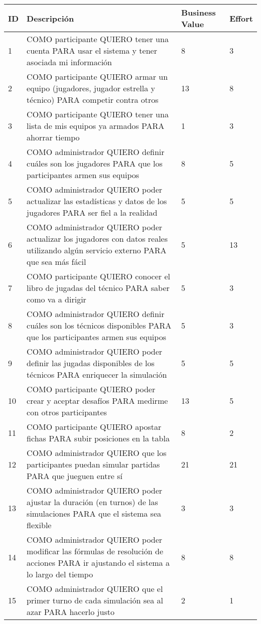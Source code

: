 \begin{center}
  \begin{tabular}{| l | p{10cm} | l | l | }
    \hline
ID & Descripción & Business Value & Effort\\  \hline
1 & COMO participante QUIERO tener una cuenta PARA usar el sistema y tener asociada mi información & 8 & 3\\  \hline
2 & COMO participante QUIERO armar un equipo (jugadores, jugador estrella y técnico) PARA competir contra otros & 13 & 8\\  \hline
3 & COMO participante QUIERO tener una lista de mis equipos ya armados PARA ahorrar tiempo & 1 & 3\\  \hline
4 & COMO administrador QUIERO definir cuáles son los jugadores PARA que los participantes armen sus equipos & 8 & 5\\  \hline
5 & COMO administrador QUIERO poder actualizar las estadísticas y datos de los jugadores PARA ser fiel a la realidad & 5 & 5\\  \hline
6 & COMO administrador QUIERO poder actualizar los jugadores con datos reales utilizando algún servicio externo PARA que sea más fácil & 5 & 13\\  \hline
7 & COMO participante QUIERO conocer el libro de jugadas del técnico PARA saber como va a dirigir & 5 & 3\\  \hline
8 & COMO administrador QUIERO definir cuáles son los técnicos disponibles PARA que los participantes armen sus equipos & 5 & 3\\  \hline
9 & COMO administrador QUIERO poder definir las jugadas disponibles de los técnicos PARA enriquecer la simulación & 5 & 5\\  \hline
10 & COMO participante QUIERO poder crear y aceptar desafíos PARA medirme con otros participantes & 13 & 5\\  \hline
11 & COMO participante QUIERO apostar fichas PARA subir posiciones en la tabla & 8 & 2\\  \hline
12 & COMO administrador QUIERO que los participantes puedan simular partidas PARA que jueguen entre sí & 21 & 21\\  \hline
13 & COMO administrador QUIERO poder ajustar la duración (en turnos) de las simulaciones PARA que el sistema sea flexible & 3 & 3\\  \hline
14 & COMO administrador QUIERO poder modificar las fórmulas de resolución de acciones PARA ir ajustando el sistema a lo largo del tiempo & 8 & 8\\  \hline
15 & COMO administrador QUIERO que el primer turno de cada simulación sea al azar PARA hacerlo justo & 2 & 1\\  \hline

\end{tabular}
\end{center}
